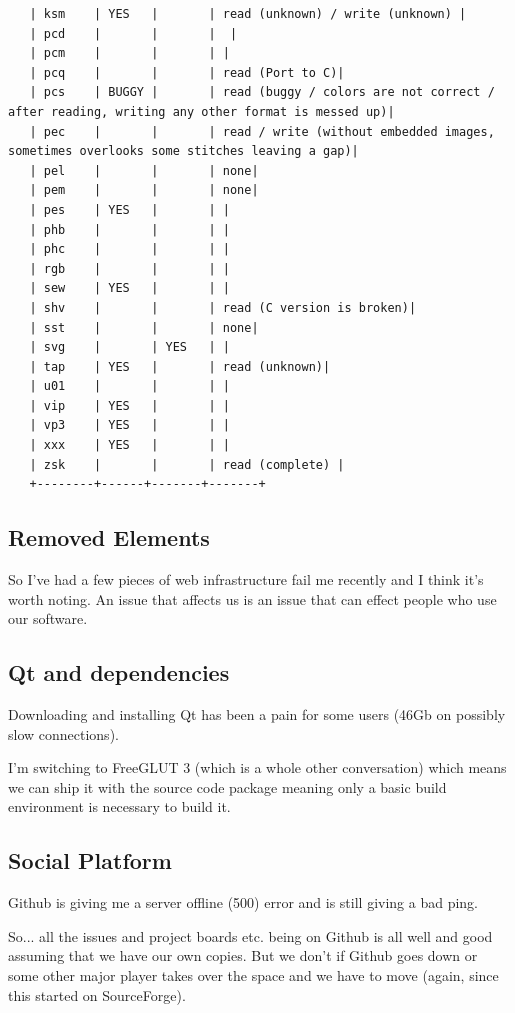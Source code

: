 \documentclass[11pt]{report}
\begin{document}
\begin{verbatim}
   | ksm    | YES   |       | read (unknown) / write (unknown) |
   | pcd    |       |       |  |
   | pcm    |       |       | |
   | pcq    |       |       | read (Port to C)|
   | pcs    | BUGGY |       | read (buggy / colors are not correct / after reading, writing any other format is messed up)|
   | pec    |       |       | read / write (without embedded images, sometimes overlooks some stitches leaving a gap)|
   | pel    |       |       | none|
   | pem    |       |       | none|
   | pes    | YES   |       | |
   | phb    |       |       | |
   | phc    |       |       | |
   | rgb    |       |       | |
   | sew    | YES   |       | |
   | shv    |       |       | read (C version is broken)|
   | sst    |       |       | none|
   | svg    |       | YES   | |
   | tap    | YES   |       | read (unknown)|
   | u01    |       |       | |
   | vip    | YES   |       | |
   | vp3    | YES   |       | |
   | xxx    | YES   |       | |
   | zsk    |       |       | read (complete) |
   +--------+------+-------+-------+
\end{verbatim}


\subsection{Removed Elements}

So I've had a few pieces of web infrastructure fail me recently and
I think it's worth noting. An issue that affects us is an issue that
can effect people who use our software.

\subsection{Qt and dependencies}

Downloading and installing Qt has been a pain for some users
(46Gb on possibly slow connections).

I'm switching to FreeGLUT 3 (which is a whole other conversation) which means we
can ship it with the source code package meaning only a basic build
environment is necessary to build it.

\subsection{Social Platform}

Github is giving me a server offline (500) error and is still giving a bad ping.

So... all the issues and project boards etc. being on Github is all well and good assuming that we have our own copies. But we don't if Github goes down or some other major player takes over the space and we have to move (again, since this started on SourceForge).
\end{document}
